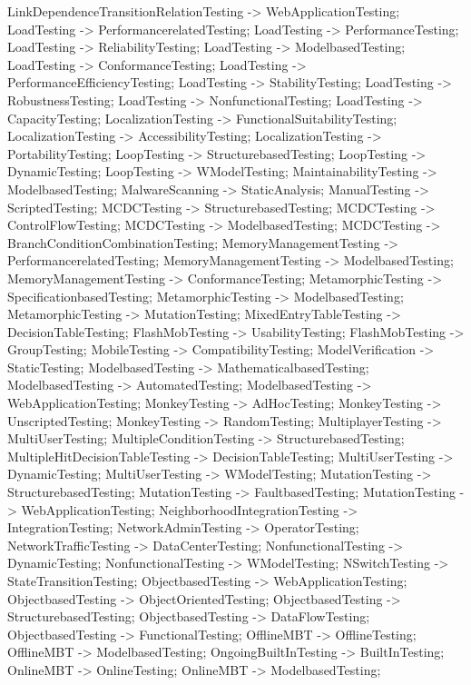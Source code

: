 \documentclass{article}
\begin{document}
{LinkDependenceTransitionRelationTesting -> WebApplicationTesting;
LoadTesting -> PerformancerelatedTesting;
LoadTesting -> PerformanceTesting;
LoadTesting -> ReliabilityTesting;
LoadTesting -> ModelbasedTesting;
LoadTesting -> ConformanceTesting;
LoadTesting -> PerformanceEfficiencyTesting;
LoadTesting -> StabilityTesting;
LoadTesting -> RobustnessTesting;
LoadTesting -> NonfunctionalTesting;
LoadTesting -> CapacityTesting;
LocalizationTesting -> FunctionalSuitabilityTesting;
LocalizationTesting -> AccessibilityTesting;
LocalizationTesting -> PortabilityTesting;
LoopTesting -> StructurebasedTesting;
LoopTesting -> DynamicTesting;
LoopTesting -> WModelTesting;
MaintainabilityTesting -> ModelbasedTesting;
MalwareScanning -> StaticAnalysis;
ManualTesting -> ScriptedTesting;
MCDCTesting -> StructurebasedTesting;
MCDCTesting -> ControlFlowTesting;
MCDCTesting -> ModelbasedTesting;
MCDCTesting -> BranchConditionCombinationTesting;
MemoryManagementTesting -> PerformancerelatedTesting;
MemoryManagementTesting -> ModelbasedTesting;
MemoryManagementTesting -> ConformanceTesting;
MetamorphicTesting -> SpecificationbasedTesting;
MetamorphicTesting -> ModelbasedTesting;
MetamorphicTesting -> MutationTesting;
MixedEntryTableTesting -> DecisionTableTesting;
FlashMobTesting -> UsabilityTesting;
FlashMobTesting -> GroupTesting;
MobileTesting -> CompatibilityTesting;
ModelVerification -> StaticTesting;
ModelbasedTesting -> MathematicalbasedTesting;
ModelbasedTesting -> AutomatedTesting;
ModelbasedTesting -> WebApplicationTesting;
MonkeyTesting -> AdHocTesting;
MonkeyTesting -> UnscriptedTesting;
MonkeyTesting -> RandomTesting;
MultiplayerTesting -> MultiUserTesting;
MultipleConditionTesting -> StructurebasedTesting;
MultipleHitDecisionTableTesting -> DecisionTableTesting;
MultiUserTesting -> DynamicTesting;
MultiUserTesting -> WModelTesting;
MutationTesting -> StructurebasedTesting;
MutationTesting -> FaultbasedTesting;
MutationTesting -> WebApplicationTesting;
NeighborhoodIntegrationTesting -> IntegrationTesting;
NetworkAdminTesting -> OperatorTesting;
NetworkTrafficTesting -> DataCenterTesting;
NonfunctionalTesting -> DynamicTesting;
NonfunctionalTesting -> WModelTesting;
NSwitchTesting -> StateTransitionTesting;
ObjectbasedTesting -> WebApplicationTesting;
ObjectbasedTesting -> ObjectOrientedTesting;
ObjectbasedTesting -> StructurebasedTesting;
ObjectbasedTesting -> DataFlowTesting;
ObjectbasedTesting -> FunctionalTesting;
OfflineMBT -> OfflineTesting;
OfflineMBT -> ModelbasedTesting;
OngoingBuiltInTesting -> BuiltInTesting;
OnlineMBT -> OnlineTesting;
OnlineMBT -> ModelbasedTesting;
}
\end{document}
